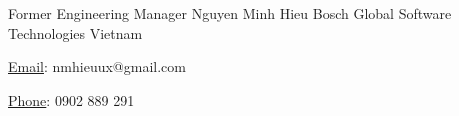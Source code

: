 


\begin{cventries}


\cventry
{Former Engineering Manager}
{Nguyen Minh Hieu}
{Bosch Global Software Technologies Vietnam}
{}
{
\begin{cvitems}
\item {\underline{Email}: nmhieuux@gmail.com}
\item {\underline{Phone}: 0902 889 291}
\end{cvitems}
}


\end{cventries}